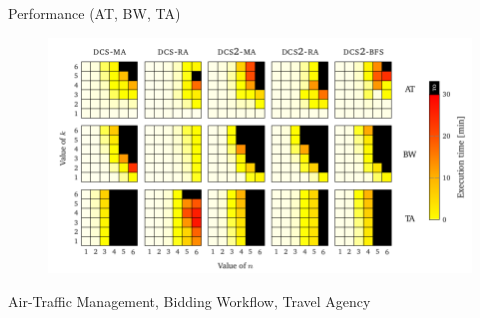 \begin{frame}{Performance (AT, BW, TA)}
    \begin{figure}
        \includegraphics[width=\textwidth]{figures/benchmark2.png}
    \end{figure}

    Air-Traffic Management, Bidding Workflow, Travel Agency
\end{frame}
